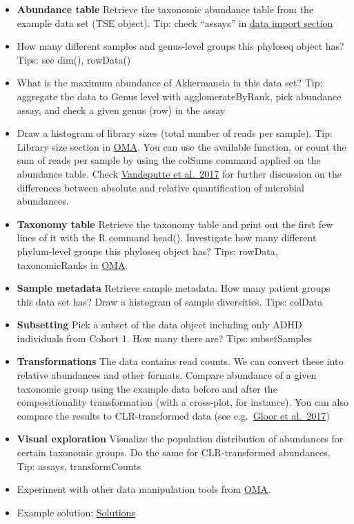 \documentclass[
]{book}
\begin{document}
\begin{itemize}
\item
  \textbf{Abundance table} Retrieve the taxonomic abundance table from the
  example data set (TSE object). Tip: check ``assays'' in \href{https://microbiome.github.io/OMA/data-introduction.html\#loading-experimental-microbiome-data}{data import
  section}
\item
  How many different samples and genus-level groups this phyloseq
  object has? Tips: see dim(), rowData()
\item
  What is the maximum abundance of Akkermansia in this data set? Tip:
  aggregate the data to Genus level with agglomerateByRank, pick
  abundance assay, and check a given genus (row) in the assay
\item
  Draw a histogram of library sizes (total number of reads per
  sample). Tip: Library size section in
  \href{https://microbiome.github.io/OMA/quality-control.html}{OMA}. You
  can use the available function, or count the sum of reads per
  sample by using the colSums command applied on the abundance
  table. Check \href{https://www.nature.com/articles/nature24460}{Vandeputte et
  al.~2017} for further
  discussion on the differences between absolute and relative
  quantification of microbial abundances.
\item
  \textbf{Taxonomy table} Retrieve the taxonomy table and print out the
  first few lines of it with the R command head(). Investigate how
  many different phylum-level groups this phyloseq object has? Tips:
  rowData, taxonomicRanks in
  \href{https://microbiome.github.io/OMA/taxonomic-information.html\#functions-to-access-taxonomic-information}{OMA}.
\item
  \textbf{Sample metadata} Retrieve sample metadata. How many patient
  groups this data set has? Draw a histogram of sample
  diversities. Tips: colData
\item
  \textbf{Subsetting} Pick a subset of the data object including only
  ADHD individuals from Cohort 1. How many there are? Tips: subsetSamples
\item
  \textbf{Transformations} The data contains read counts. We can convert
  these into relative abundances and other formats. Compare abundance
  of a given taxonomic group using the example data before and after
  the compositionality transformation (with a cross-plot, for
  instance). You can also compare the results to CLR-transformed data
  (see e.g.~\href{https://www.frontiersin.org/articles/10.3389/fmicb.2017.02224/full}{Gloor et
  al.~2017})
\item
  \textbf{Visual exploration} Visualize the population distribution of
  abundances for certain taxonomic groups. Do the same for
  CLR-transformed abundances. Tip: assays, transformCounts
\item
  Experiment with other data manipulation tools from
  \href{https://microbiome.github.io/OMA/taxonomic-information.html\#functions-to-access-taxonomic-information}{OMA}.
\item
  Example solution: \href{06-3-ex-sol-ADHD.html}{Solutions}
\end{itemize}
\end{document}
